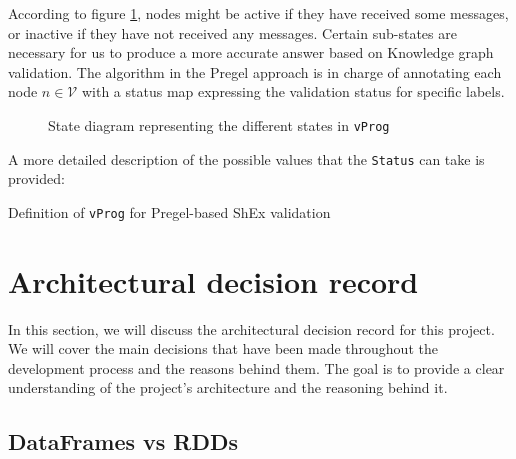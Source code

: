 According to figure \ref{fig:state:pregel}, nodes might be active if they have received some messages, or inactive if they have not received any messages. Certain sub-states are necessary for us to produce a more accurate answer based on Knowledge graph validation. The algorithm in the Pregel approach is in charge of annotating each node $n\in\mathcal{V}$ with a status map expressing the validation status for specific labels.

\begin{figure}[H]
    \centering
    
    \caption[State diagram representing the different states in \texttt{vProg}]{State diagram representing the different states in \texttt{vProg}~\cite{https://doi.org/10.48550/arxiv.2110.11709}}
    \label{fig:state:pregel}
\end{figure}

A more detailed description of the possible values that the \texttt{Status} can take is provided:

\begin{center}
    
\end{center}

\begin{pseudocode}
    
\end{pseudocode}

\begin{table}
    \centering
    
    \caption{Definition of \texttt{vProg} for Pregel-based ShEx validation}
\end{table}
\label{vProg}

\section{Architectural decision record}

In this section, we will discuss the architectural decision record for this project. We will cover the main decisions that have been made throughout the development process and the reasons behind them. The goal is to provide a clear understanding of the project's architecture and the reasoning behind it.

\subsection{DataFrames vs RDDs}

